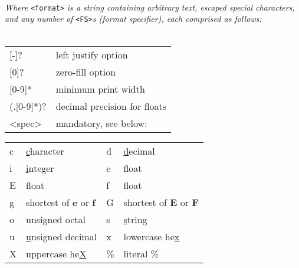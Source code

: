 \\[1mm]
\textit{Where }\texttt{<format>}\textit{ is a string containing arbitrary text, escaped special characters, and any number of }\texttt{<FS>}\textit{s (format specifier), each comprised as follows:}\\
\\
\begin{tabular}{l l}
    {[-]}?	&	left justify option		\\
    {[0]}?	&	zero-fill option		\\
    {[0-9]}*	&	minimum print width		\\
    (.[0-9]*)?	&	decimal precision for floats	\\
    <spec>	&	mandatory, see below:		\\
\end{tabular}
\begin{tabular}{l l | l l}
    c	&	\ul{c}haracter		&	
    d	& 	\ul{d}ecimal		\\
    i	& 	\ul{i}nteger		&
    e	&	float			\\
    E	&	float			&
    f	&	float			\\
    g	& 	shortest of \textbf{e} or \textbf{f}	&
    G	&	shortest of \textbf{E} or \textbf{F}	\\
    o	&	unsigned octal		&
    s	& 	\ul{s}tring			\\
    u	&	\ul{u}nsigned decimal	&
    x	&	lowercase he\ul{x}	\\
    X	&	uppercase he\ul{X}	&
    \%	&	literal \%		\\
\end{tabular}
\\
\\
\\
\\
\\
